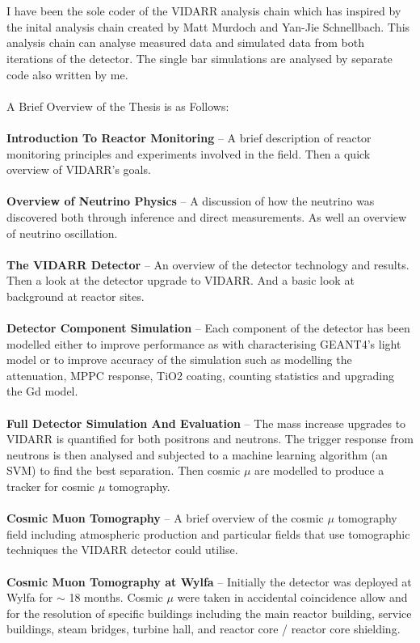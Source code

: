 \\\\I have been the sole coder of the VIDARR analysis chain which has inspired by the inital analysis chain created by Matt Murdoch and Yan-Jie Schnellbach. This analysis chain can analyse measured data and simulated data from both iterations of the detector. The single bar simulations are analysed by separate code also written by me. 
\\\\A Brief Overview of the Thesis is as Follows:
\\\\\textbf{Introduction To Reactor Monitoring} -- A brief description of reactor monitoring principles and experiments involved in the field. Then a quick overview of VIDARR's goals.  
\\\\\textbf{Overview of Neutrino Physics} -- A discussion of how the neutrino was discovered both through inference and direct measurements. As well an overview of neutrino oscillation.
\\\\\textbf{The VIDARR Detector} -- An overview of the detector technology and results. Then a look at the detector upgrade to VIDARR. And a basic look at background at reactor sites.
\\\\\textbf{Detector Component Simulation} -- Each component of the detector has been modelled either to improve performance as with characterising GEANT4's light model or to improve accuracy of the simulation such as modelling the attenuation, MPPC response, TiO2 coating, counting statistics and upgrading the Gd model. 
\\\\\textbf{Full Detector Simulation And Evaluation} -- The mass increase upgrades to VIDARR is quantified for both positrons and neutrons. The trigger response from neutrons is then analysed and subjected to a machine learning algorithm (an SVM) to find the best separation. Then cosmic $\mu$ are modelled to produce a tracker for cosmic $\mu$ tomography.
\\\\\textbf{Cosmic Muon Tomography} -- A brief overview of the cosmic $\mu$ tomography field including atmospheric production and particular fields that use tomographic techniques the VIDARR detector could utilise. 
\\\\\textbf{Cosmic Muon Tomography at Wylfa} -- Initially the detector was deployed at Wylfa for $\sim$ 18 months. Cosmic $\mu$ were taken in accidental coincidence allow and for the resolution of specific buildings including the main reactor building, service buildings, steam bridges, turbine hall, and reactor core / reactor core shielding.